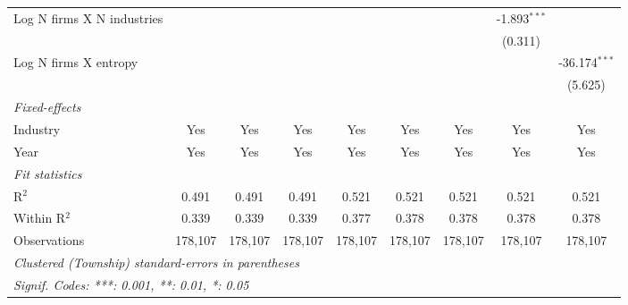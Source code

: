 \begin{tabular}{lcccccccc}
   Log N firms X N industries                            &                 &                 &                 &                  &                  &                  & -1.893$^{***}$   &   \\   
                                                         &                 &                 &                 &                  &                  &                  & (0.311)          &   \\   
   Log N firms X entropy                                 &                 &                 &                 &                  &                  &                  &                  & -36.174$^{***}$\\   
                                                         &                 &                 &                 &                  &                  &                  &                  & (5.625)\\   
   \midrule
   \emph{Fixed-effects}\\
   Industry                                              & Yes             & Yes             & Yes             & Yes              & Yes              & Yes              & Yes              & Yes\\  
   Year                                                  & Yes             & Yes             & Yes             & Yes              & Yes              & Yes              & Yes              & Yes\\  
   \midrule
   \emph{Fit statistics}\\
   R$^2$                                                 & 0.491           & 0.491           & 0.491           & 0.521            & 0.521            & 0.521            & 0.521            & 0.521\\  
   Within R$^2$                                          & 0.339           & 0.339           & 0.339           & 0.377            & 0.378            & 0.378            & 0.378            & 0.378\\  
   Observations                                          & 178,107         & 178,107         & 178,107         & 178,107          & 178,107          & 178,107          & 178,107          & 178,107\\  
   \midrule \midrule
   \multicolumn{9}{l}{\emph{Clustered (Township) standard-errors in parentheses}}\\
   \multicolumn{9}{l}{\emph{Signif. Codes: ***: 0.001, **: 0.01, *: 0.05}}\\
\end{tabular}
\par\endgroup
